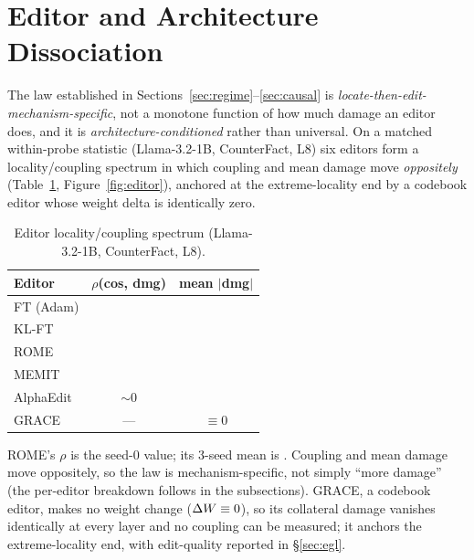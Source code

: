 \section{Editor and Architecture Dissociation}
\label{sec:dissociation}

The law established in Sections~\ref{sec:regime}--\ref{sec:causal} is
\emph{locate-then-edit-mechanism-specific}, not a monotone function of how
much damage an editor does, and it is \emph{architecture-conditioned}
rather than universal. On a matched within-probe statistic (Llama-3.2-1B,
CounterFact, L8) six editors form a locality/coupling spectrum in which
coupling and mean damage move \emph{oppositely} (Table~\ref{tab:editorspectrum},
Figure~\ref{fig:editor}), anchored at the extreme-locality end by a codebook
editor whose weight delta is identically zero.



\begin{table}[t]
\centering\small
\caption{Editor locality/coupling spectrum (Llama-3.2-1B, CounterFact, L8).}
\label{tab:editorspectrum}
\begin{tabular}{@{}lcc@{}}
\toprule
Editor & $\rho$(cos, dmg) & mean $|$dmg$|$ \\
\midrule
FT (Adam)  & \ftRho{}      & \ftDmg{}  \\
KL-FT      & \ftkatRho{}   & \ftkatDmg{} \\
ROME       & \romeRhoSzero{} & \romeDmg{} \\
MEMIT      & \memitRhoLeight{} & \memitDmg{} \\
AlphaEdit  & $\sim$0       & \alphaFloor{} \\
GRACE      & ---           & $\equiv 0$ \\
\bottomrule
\end{tabular}
\par\smallskip
{\footnotesize ROME's $\rho$ is the seed-0 value; its 3-seed mean is
\romeRhoThreeSeed{}. Coupling and mean damage move oppositely, so the law is mechanism-specific, not simply ``more damage'' (the per-editor breakdown follows in the subsections). GRACE, a codebook editor, makes no weight change ($\Delta W\equiv 0$), so its collateral damage vanishes identically at every layer and no coupling can be measured; it anchors the extreme-locality end, with edit-quality reported in \S\ref{sec:egl}.\par}
\end{table}

